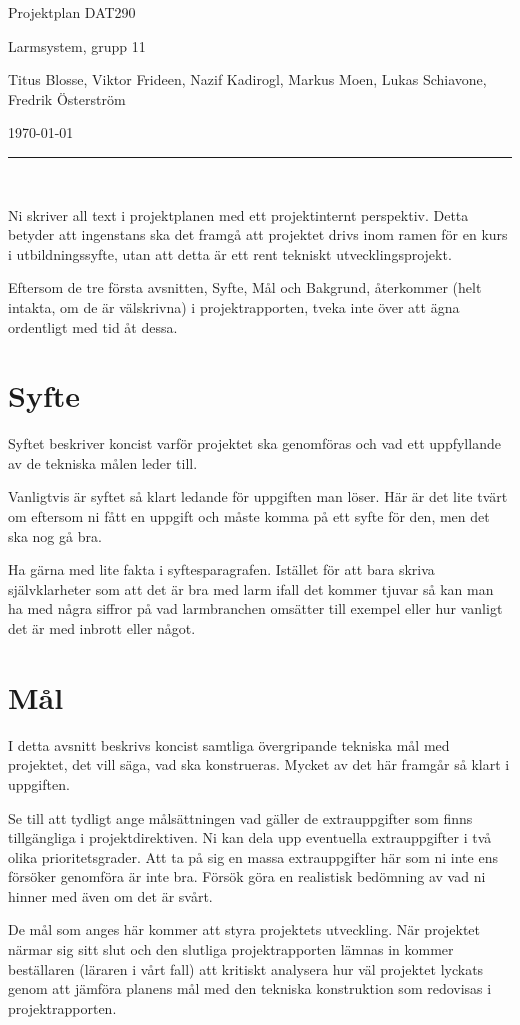 \documentclass{article}
\begin{document}
\begin{center}
\thispagestyle{empty}
\parskip=14pt%
\vspace*{3\parskip}%

{\LARGE Projektplan DAT290}

{\large Larmsystem, grupp 11

Titus Blosse, Viktor Frideen, Nazif Kadirogl, Markus Moen, Lukas Schiavone, Fredrik Österström

\today}


\rule{7cm}{0.4pt}\\
\end{center}
\newpage

\thispagestyle{empty}
\tableofcontents
\newpage


Ni skriver all text i projektplanen med ett projektinternt perspektiv. Detta
betyder att ingenstans ska det framgå att projektet drivs inom ramen för en
kurs i utbildningssyfte, utan att detta är ett rent tekniskt utvecklingsprojekt.\par
Eftersom de tre första avsnitten, Syfte, Mål och Bakgrund, återkommer (helt
intakta, om de är välskrivna) i projektrapporten, tveka inte över att ägna ordentligt med tid åt dessa.

\section{Syfte}
Syftet beskriver koncist varför projektet ska genomföras och vad ett uppfyllande
av de tekniska målen leder till.\par
Vanligtvis är syftet så klart ledande för uppgiften man löser. Här är det lite
tvärt om eftersom ni fått en uppgift och måste komma på ett syfte för den, men
det ska nog gå bra.\par
Ha gärna med lite fakta i syftesparagrafen. Istället för att bara skriva självklarheter som att det är bra med larm ifall det kommer tjuvar så kan man ha
med några siffror på vad larmbranchen omsätter till exempel eller hur vanligt
det är med inbrott eller något.

\section{Mål}
I detta avsnitt beskrivs koncist samtliga övergripande tekniska mål med projektet, det vill säga, vad ska konstrueras. Mycket av det här framgår så klart i
uppgiften.\par
Se till att tydligt ange målsättningen vad gäller de extrauppgifter som finns
tillgängliga i projektdirektiven. Ni kan dela upp eventuella extrauppgifter i två
olika prioritetsgrader. Att ta på sig en massa extrauppgifter här som ni inte ens
försöker genomföra är inte bra. Försök göra en realistisk bedömning av vad ni
hinner med även om det är svårt.\par
De mål som anges här kommer att styra projektets utveckling. När projektet närmar sig sitt slut och den slutliga projektrapporten lämnas in kommer
beställaren (läraren i vårt fall) att kritiskt analysera hur väl projektet lyckats
genom att jämföra planens mål med den tekniska konstruktion som redovisas i
projektrapporten.
\end{document}
